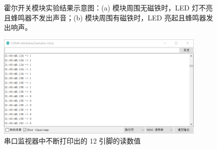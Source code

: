 \documentclass[UTF8, oneside]{ctexbook}
\begin{document}
\begin{figure}[h]
    \centering


    \centering
    \caption{霍尔开关模块实验结果示意图：(a) 模块周围无磁铁时，LED 灯不亮
    且蜂鸣器不发出声音；(b) 模块周围有磁铁时，LED 亮起且蜂鸣器发出响声。}
    \label{s18_1}
    
\end{figure}

\begin{figure}[h]
    \centering
    \includegraphics[width=0.9\textwidth]{./result/sensor/18/result1.png}
    \caption{串口监视器中不断打印出的 12 引脚的读数值}
    \label{s18_2}
\end{figure}
\end{document}
